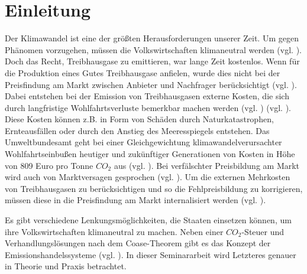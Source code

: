 \chapter{Einleitung}

Der Klimawandel ist eine der größten Herausforderungen unserer Zeit. Um gegen Phänomen vorzugehen, müssen die Volkswirtschaften klimaneutral werden (vgl. \cite[S. 162]{hubert.2020}).
Doch das Recht, Treibhausgase zu emittieren, war lange Zeit kostenlos. Wenn für die Produktion eines Gutes Treibhausgase anfielen, wurde dies nicht bei der Preisfindung am Markt zwischen Anbieter und Nachfrager berücksichtigt (vgl. \cite[S. 161]{hubert.2020}).
Dabei entstehen bei der Emission von Treibhausgasen externe Kosten, die sich durch langfristige Wohlfahrtsverluste bemerkbar machen werden (vgl. \cite[S. 25]{rabe.2018}) (vgl. \cite{ub4.2023}).
Diese Kosten können z.B. in Form von Schäden durch Naturkatastrophen, Ernteausfällen oder durch den Anstieg des Meeresspiegels entstehen.
Das Umweltbundesamt geht bei einer Gleichgewichtung klimawandelverursachter Wohlfahrtseinbußen heutiger und zukünftiger Generationen von Kosten in Höhe von 809 Euro pro Tonne $CO_2$ aus (vgl. \cite{ub4.2023}).
Bei verfälschter Preisbildung am Markt wird auch von Marktversagen gesprochen (vgl. \cite[S. 268]{hubert.2019}).
Um die externen Mehrkosten von Treibhausgasen zu berücksichtigen und so die Fehlpreisbildung zu korrigieren, müssen diese in die Preisfindung am Markt internalisiert werden (vgl. \cite[S. 161]{hubert.2020}).

Es gibt verschiedene Lenkungsmöglichkeiten, die Staaten einsetzen können, um ihre Volkswirtschaften klimaneutral zu machen.
Neben einer $CO_2$-Steuer und Verhandlungslösungen nach dem Coase-Theorem gibt es das Konzept der Emissionshandelssysteme (vgl. \cite[S. 161]{hubert.2020}).
In dieser Seminararbeit wird Letzteres genauer in Theorie und Praxis betrachtet.